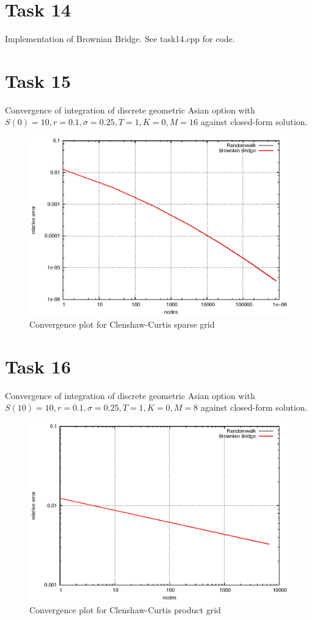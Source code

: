 \documentclass[]{article}
\begin{document}
\section*{Task 14}
Implementation of Brownian Bridge. See task14.cpp for code.

\section*{Task 15}
Convergence of integration of discrete geometric Asian option with $S(0)=10,r=0.1,\sigma=0.25,T=1,K=0,M=16$ against closed-form solution.
\begin{figure}[!ht]
\centering
\includegraphics{task15}
\caption{Convergence plot for Clenshaw-Curtis sparse grid}
\label{fig:Task15}
\end{figure}
\clearpage

\section*{Task 16}
Convergence of integration of discrete geometric Asian option with $S(10)=10,r=0.1,\sigma=0.25,T=1,K=0,M=8$ against closed-form solution.

\begin{figure}[!ht]
\centering
\includegraphics{task16_ccprod}
\caption{Convergence plot for Clenshaw-Curtis product grid}
\label{fig:Task16a}
\end{figure}
\end{document}
